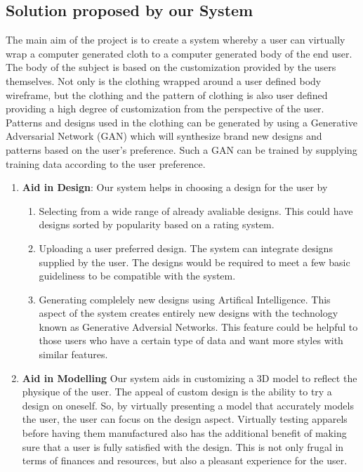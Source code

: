 \documentclass{article}
\begin{document}
	\subsection{Solution proposed by our System}
	The main aim of the project is to create a system whereby a user can virtually wrap a computer generated cloth to a computer generated body of the end user. The body of the subject is based on the customization provided by the users themselves. Not only is the clothing wrapped around a user defined body wireframe, but the clothing and the pattern of clothing is also user defined providing a high degree of customization from the perspective of the user. 
Patterns and designs used in the clothing can be generated by using a Generative Adversarial Network (GAN) which will synthesize brand new designs and patterns based on the user’s preference. Such a GAN can be trained by supplying training data according to the user preference.
	\begin{enumerate}
	\item \textbf{Aid in Design}:
	Our system helps in choosing a design for the user by
		\begin{enumerate}
			\item Selecting from a wide range of already avaliable designs. This could have designs sorted by popularity based on a rating system. 
			\item Uploading a user preferred design. The system can integrate designs supplied by the user. The designs would be required to meet a few basic guideliness to be compatible with the system.
			
			\item Generating complelely new designs using Artifical Intelligence. This aspect of the system creates entirely new designs with the technology known as Generative Adversial Networks. This feature could be helpful to those users who have a certain type of data and want more styles with similar features.
		\end{enumerate}
	\item \textbf{Aid in Modelling}
	Our system aids in customizing a 3D model to reflect the physique of the user. The appeal of custom design is the ability to try a design on oneself. So, by virtually presenting a model that accurately models the user, the user can focus on the design aspect. Virtually testing apparels before having them manufactured also has the additional benefit of making sure that a user is fully satisfied with the design. This is not only frugal in terms of finances and resources, but also a pleasant experience for the user.
	
	
	\end{enumerate}
\end{document}
